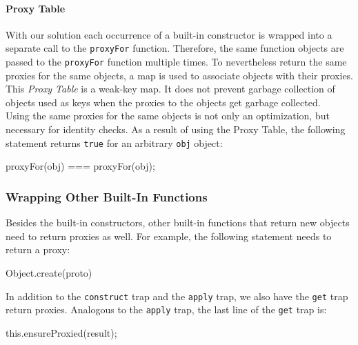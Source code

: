 \paragraph{Proxy Table}
With our solution each occurrence of a built-in constructor is wrapped into a separate call to the \lstinline{proxyFor} function.
Therefore, the same function objects are passed to the \lstinline{proxyFor} function multiple times.
To nevertheless return the same proxies for the same objects, a map is used to associate objects with their proxies.
This \emph{Proxy Table} is a weak-key map.
It does not prevent garbage collection of objects used as keys when the proxies to the objects get garbage collected.\\
Using the same proxies for the same objects is not only an optimization, but necessary for identity checks.
As a result of using the Proxy Table, the following statement returns \lstinline{true} for an arbitrary \lstinline{obj} object:

\begin{code}{}{}
proxyFor(obj) === proxyFor(obj);
\end{code}
\iffalse
\end{verbatim}\fi



\subsubsection{Wrapping Other Built-In Functions}

Besides the built-in constructors, other built-in functions that return new objects need to return proxies as well.
For example, the following statement needs to return a proxy:

\begin{code}{}{}
Object.create(proto)
\end{code}
\iffalse
\end{verbatim}\fi

In addition to the \lstinline{construct} trap and the \lstinline{apply} trap, we also have the \lstinline{get} trap return proxies.
Analogous to the \lstinline{apply} trap, the last line of the \lstinline{get} trap is:

\begin{code}{}{}
this.ensureProxied(result);
\end{code}
\iffalse
\end{verbatim}\fi


